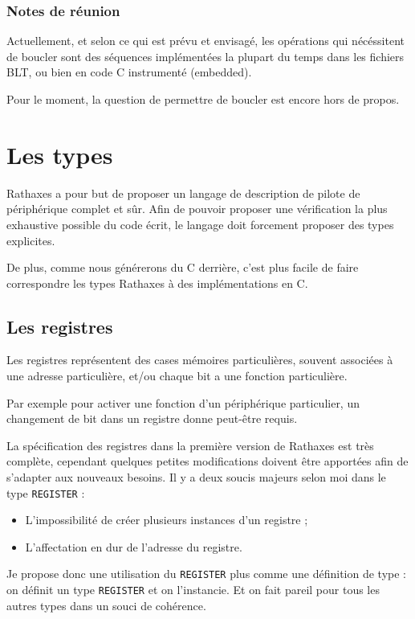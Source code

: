 \documentclass{rtxreport}
\begin{document}
\subsection{Notes de réunion}
Actuellement, et selon ce qui est prévu et envisagé, les opérations qui
nécéssitent de boucler sont des séquences implémentées la plupart du temps dans
les fichiers BLT, ou bien en code C instrumenté (embedded).

Pour le moment, la question de permettre de boucler est encore hors de propos.

\chapter{Les types}

Rathaxes a pour but de proposer un langage de description de pilote de
périphérique complet et sûr. Afin de pouvoir proposer une vérification la plus
exhaustive possible du code écrit, le langage doit forcement proposer des types
explicites.

De plus, comme nous générerons du C derrière, c’est plus facile de faire
correspondre les types Rathaxes à des implémentations en C.

\section{Les registres}

Les registres représentent des cases mémoires particulières, souvent associées
à une adresse particulière, et/ou chaque bit a une fonction particulière.

Par exemple pour activer une fonction d’un périphérique particulier, un
changement de bit dans un registre donne peut-être requis.

La spécification des registres dans la première version de Rathaxes est très
complète, cependant quelques petites modifications doivent être apportées afin
de s’adapter aux nouveaux besoins.
Il y a deux soucis majeurs selon moi dans le type \texttt{REGISTER} : 
\begin{itemize}
	\item L’impossibilité de créer plusieurs instances d’un registre ; 
	\item L’affectation en dur de l’adresse du registre. 
\end{itemize}

Je propose donc une utilisation du \texttt{REGISTER} plus comme une définition
de type : on définit un type \texttt{REGISTER} et on l’instancie. Et on fait
pareil pour tous les autres types dans un souci de cohérence.
\end{document}
